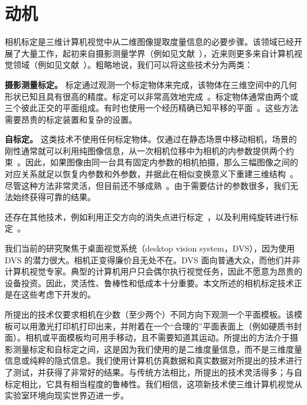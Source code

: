 \section{动机}

相机标定是三维计算机视觉中从二维图像提取度量信息的必要步骤。该领域已经开展了大量工作，起初来自摄影测量学界（例如见文献~\cite{brown1971close,faig1975calibration}），近来则更多来自计算机视觉领域（例如见文献~\cite{gennery1979stereo,ganapathy1984decomposition,tsai1987versatile,faugeras1986stereo,weng1992camera,wei1993complete,maybank1992theory,faugeras1992self,triggs1998autocalibration}）。粗略地说，我们可以将这些技术分为两类：

\textbf{摄影测量标定。} 标定通过观测一个标定物体来完成，该物体在三维空间中的几何形状已知且具有很高的精度。标定可以非常高效地完成~\cite{faugeras1993three}。标定物体通常由两个或三个彼此正交的平面组成。有时也使用一个经历精确已知平移的平面~\cite{tsai1987versatile}。这些方法需要昂贵的标定装置和复杂的设置。

\textbf{自标定。} 这类技术不使用任何标定物体。仅通过在静态场景中移动相机，场景的刚性通常就可以利用纯图像信息，从一次相机位移中为相机的内参数提供两个约束~\cite{maybank1992theory}。因此，如果图像由同一台具有固定内参数的相机拍摄，那么三幅图像之间的对应关系就足以恢复内参数和外参数，并据此在相似变换意义下重建三维结构~\cite{luong1997self,hartley1994several}。尽管这种方法非常灵活，但目前还不够成熟~\cite{bougnoux1998projective}。由于需要估计的参数很多，我们无法始终获得可靠的结果。

还存在其他技术，例如利用正交方向的消失点进行标定~\cite{caprile1990vanishing,liebowitz1998metric}，以及利用纯旋转进行标定~\cite{hartley1994rotating,stein1995accurate}。

我们当前的研究聚焦于桌面视觉系统（desktop vision system，DVS），因为使用 DVS 的潜力很大。相机正变得廉价且无处不在。DVS 面向普通大众，而他们并非计算机视觉专家。典型的计算机用户只会偶尔执行视觉任务，因此不愿意为昂贵的设备投资。因此，灵活性、鲁棒性和低成本十分重要。本文所述的相机标定技术正是在这些考虑下开发的。

所提出的技术仅要求相机在少数（至少两个）不同方向下观测一个平面模板。该模板可以用激光打印机打印出来，并附着在一个“合理的”平面表面上（例如硬质书封面）。相机或平面模板均可用手移动，且不需要知道其运动。所提出的方法介于摄影测量标定和自标定之间，这是因为我们使用的是二维度量信息，而不是三维度量信息或纯粹的隐式信息。我们使用计算机仿真数据和真实数据对所提出的技术进行了测试，并获得了非常好的结果。与传统方法相比，所提出的技术灵活得多；与自标定相比，它具有相当程度的鲁棒性。我们相信，这项新技术使三维计算机视觉从实验室环境向现实世界迈进一步。

